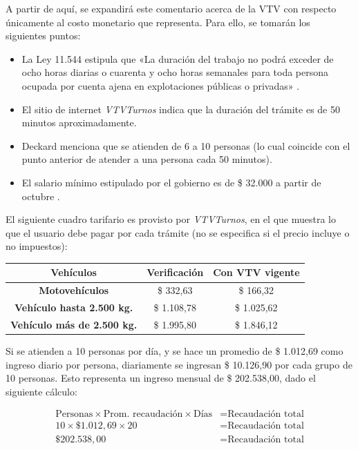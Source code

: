 \documentclass[12pt,a4paper,twoside]{book}
\begin{document}
A partir de aquí, se expandirá este comentario acerca de la VTV con respecto únicamente al costo monetario que representa. Para ello, se tomarán los siguientes puntos:

\begin{itemize}
\item La Ley 11.544 estipula que «La duración del trabajo no podrá exceder de ocho horas diarias o cuarenta y ocho horas semanales para toda persona ocupada por cuenta ajena en explotaciones públicas o privadas» \cite{ley:trabajo}.
\item El sitio de internet \textit{VTVTurnos} indica que la duración del trámite es de 50 minutos aproximadamente.
\item Deckard menciona que se atienden de 6 a 10 personas (lo cual coincide con el punto anterior de atender a una persona cada 50 minutos).
\item El salario mínimo estipulado por el gobierno es de \$ 32.000 a partir de octubre \cite{salariominimo:2021}.
\end{itemize}

El siguiente cuadro tarifario es provisto por \textit{VTVTurnos}, en el que muestra lo que el usuario debe pagar por cada trámite (no se especifica si el precio incluye o no impuestos):

\begin{center}
\begin{tabular}{|c|c|c|}
\hline 
\textbf{Vehículos} & \textbf{Verificación} & \textbf{Con VTV vigente} \\ 
\hline 
\textbf{Motovehículos} & \$ 332,63 & \$ 166,32 \\ 
\hline 
\textbf{Vehículo hasta 2.500 kg.} & \$ 1.108,78 & \$ 1.025,62 \\ 
\hline 
\textbf{Vehículo más de 2.500 kg.} & \$ 1.995,80 & \$ 1.846,12 \\ 
\hline 
\end{tabular} 
\end{center}

Si se atienden a 10 personas por día, y se hace un promedio de \$ 1.012,69 como ingreso diario por persona, diariamente se ingresan \$ 10.126,90 por cada grupo de 10 personas. Esto representa un ingreso mensual de \$ 202.538,00, dado el siguiente cálculo:

\begin{align*}
\text{Personas} \times \text{Prom. recaudación} \times \text{Días} &= \text{Recaudación total} \\
\text{10} \times \text{\$ } 1.012,69 \times 20 &= \text{Recaudación total} \\
\text{\$ } 202.538,00 &= \text{Recaudación total}
\end{align*}
\end{document}
